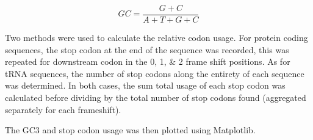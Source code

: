 \documentclass[../main.tex]{subfile}
\begin{document}
        \begin{equation}
            GC = \frac{G + C}{A + T + G + C} \label{eq:method/GC}
        \end{equation}

        Two methods were used to calculate the relative codon usage. For protein coding sequences, the stop codon at the end of the sequence was recorded, this was repeated for downstream codon in the \numlist{0;1;2} frame shift positions. As for tRNA sequences, the number of stop codons along the entirety of each sequence was determined. In both cases, the sum total usage of each stop codon was calculated before dividing by the total number of stop codons found (aggregated separately for each frameshift).

        The GC3 and stop codon usage was then plotted using Matplotlib.
\end{document}
